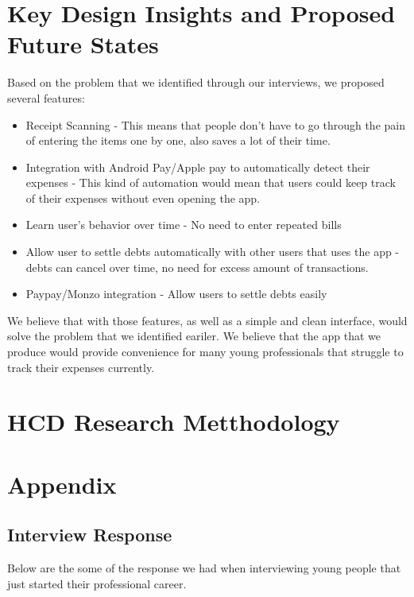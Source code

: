 \documentclass[a4wide, 11pt]{article}
\begin{document}
\section{Key Design Insights and Proposed Future States}

Based on the problem that we identified through our interviews, we proposed several features:
\begin{itemize}
\item Receipt Scanning - This means that people don't have to go through the pain of entering the items one by one, also saves a lot of their time.
\item Integration with Android Pay/Apple pay to automatically detect their expenses - This kind of automation would mean that users could keep track of their expenses without even opening the app.
\item Learn user's behavior over time - No need to enter repeated bills
\item Allow user to settle debts automatically with other users that uses the app - debts can cancel over time, no need for excess amount of transactions.
\item Paypay/Monzo integration - Allow users to settle debts easily
\end{itemize} 

We believe that with those features, as well as a simple and clean interface, would solve the problem that we identified eariler. We believe that the app that we produce would provide convenience for many young professionals that struggle to track their expenses currently.

\section{HCD Research Metthodology}

\newpage
\section{Appendix}

\subsection{Interview Response}
\label{intRes}
Below are the some of the response we had when interviewing young people that just started their professional career.
\end{document}
